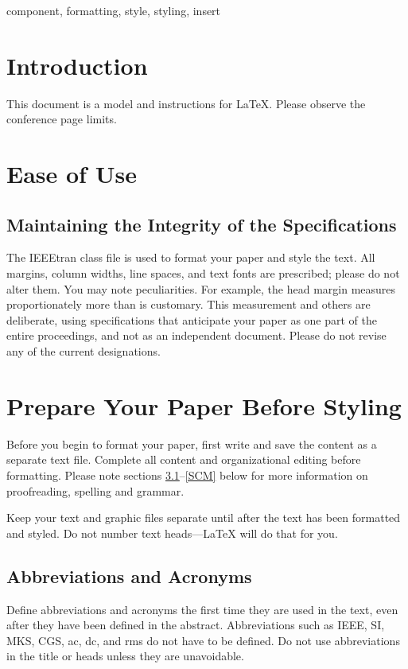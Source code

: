 \documentclass[conference]{IEEEtran}
\begin{document}
\begin{IEEEkeywords}
component, formatting, style, styling, insert
\end{IEEEkeywords}

\section{Introduction}
This document is a model and instructions for \LaTeX.
Please observe the conference page limits. 

\section{Ease of Use}

\subsection{Maintaining the Integrity of the Specifications}

The IEEEtran class file is used to format your paper and style the text. All margins, 
column widths, line spaces, and text fonts are prescribed; please do not 
alter them. You may note peculiarities. For example, the head margin
measures proportionately more than is customary. This measurement 
and others are deliberate, using specifications that anticipate your paper 
as one part of the entire proceedings, and not as an independent document. 
Please do not revise any of the current designations.

\section{Prepare Your Paper Before Styling}
Before you begin to format your paper, first write and save the content as a 
separate text file. Complete all content and organizational editing before 
formatting. Please note sections \ref{AA}--\ref{SCM} below for more information on 
proofreading, spelling and grammar.

Keep your text and graphic files separate until after the text has been 
formatted and styled. Do not number text heads---{\LaTeX} will do that 
for you.

\subsection{Abbreviations and Acronyms}\label{AA}
Define abbreviations and acronyms the first time they are used in the text, 
even after they have been defined in the abstract. Abbreviations such as 
IEEE, SI, MKS, CGS, ac, dc, and rms do not have to be defined. Do not use 
abbreviations in the title or heads unless they are unavoidable.
\end{document}
